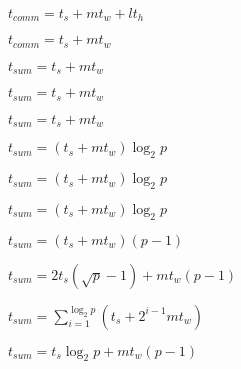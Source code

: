 \documentclass[10pt]{book}
\begin{document}
\begin{mdSnippets}
\begin{mdInlineSnippet}%
$t_{comm} = t_s + mt_w+ lt_h$\end{mdInlineSnippet}%
\begin{mdInlineSnippet}%
$t_{comm} = t_s + mt_w$\end{mdInlineSnippet}%
\begin{mdInlineSnippet}[10819d45a6f11b738122f5fb8de9b0d8]%
$t_{sum} = t_s + mt_w$\end{mdInlineSnippet}%
\begin{mdInlineSnippet}[10819d45a6f11b738122f5fb8de9b0d8]%
$t_{sum} = t_s + mt_w$\end{mdInlineSnippet}%
\begin{mdInlineSnippet}[10819d45a6f11b738122f5fb8de9b0d8]%
$t_{sum} = t_s + mt_w$\end{mdInlineSnippet}%
\begin{mdInlineSnippet}%
$t_{sum} = (t_s + mt_w) \log _2 p$\end{mdInlineSnippet}%
\begin{mdInlineSnippet}%
$t_{sum} = (t_s + mt_w) \log _2 p$\end{mdInlineSnippet}%
\begin{mdInlineSnippet}%
$t_{sum} = (t_s + mt_w) \log _2 p$\end{mdInlineSnippet}%
\begin{mdInlineSnippet}[76ecbdcc60db753d50e0f54442684a1f]%
$t_{sum} = (t_s + mt_w)(p - 1)$\end{mdInlineSnippet}%
\begin{mdInlineSnippet}[9f1e04740609c172e554c5544a2e4175]%
$t_{sum} = 2t_s(\sqrt {p} - 1) + mt_w(p  - 1)$\end{mdInlineSnippet}%
\begin{mdInlineSnippet}[10d3a073ed1cf5ba55cca927e2318a98]%
$t_{sum} = \sum^{\log _2 p}_{i=1}{(t_s+2^{i - 1}m{t_w})}$\end{mdInlineSnippet}%
\begin{mdInlineSnippet}[d0200a7499f424eef524040c317cc427]%
$t_{sum} = t_s{\log _2 p} + mt_w(p - 1)$\end{mdInlineSnippet}%

\end{mdSnippets}
\end{document}
